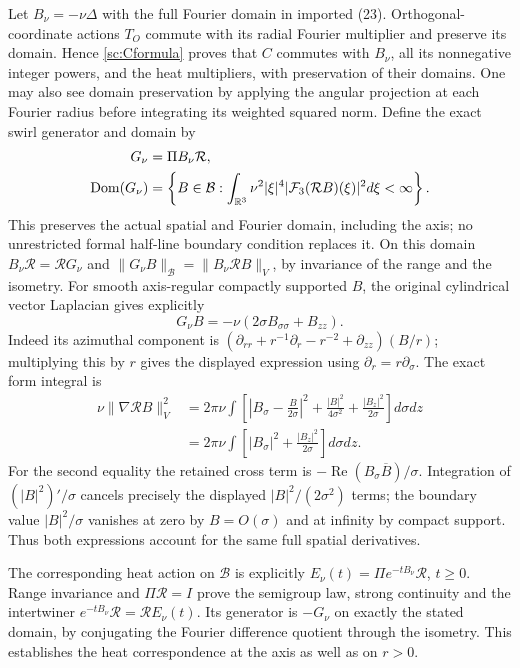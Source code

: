 Let $B_\nu=-\nu\Delta$ with the full Fourier domain in imported
(23). Orthogonal-coordinate actions $T_O$ commute with its radial
Fourier multiplier and preserve its domain. Hence \eqref{sc:Cformula}
proves that $C$ commutes with $B_\nu$, all its nonnegative integer
powers, and the heat multipliers, with preservation of their domains.
One may also see domain preservation by applying the angular projection
at each Fourier radius before integrating its weighted squared norm.
Define the exact swirl generator and domain by
\begin{align*}
 G_\nu&=\Pi B_\nu\mathcal R,\\
 \operatorname{Dom}(G_\nu)
 &=\left\{B\in\mathcal B:
    \int_{\mathbb R^3}\nu^2|\xi|^4
       |\mathcal F_3(\mathcal RB)(\xi)|^2d\xi<\infty\right\}.
\end{align*}
This preserves the actual spatial and Fourier domain, including the
axis; no unrestricted formal half-line boundary condition replaces it.
On this domain $B_\nu\mathcal R=\mathcal RG_\nu$ and
$\|G_\nu B\|_{\mathcal B}=\|B_\nu\mathcal RB\|_V$,
by invariance of the range and the isometry.
For smooth axis-regular compactly supported $B$, the original
cylindrical vector Laplacian gives explicitly
\[
 G_\nu B=-\nu(2\sigma B_{\sigma\sigma}+B_{zz}).
\]
Indeed its azimuthal component is
$(\partial_{rr}+r^{-1}\partial_r-r^{-2}+\partial_{zz})(B/r)$;
multiplying this by $r$ gives the displayed expression using
$\partial_r=r\partial_\sigma$. The exact form integral is
\begin{align*}
 \nu\|\nabla\mathcal RB\|_V^2
 &=2\pi\nu\int\left[
   \left|B_\sigma-\frac{B}{2\sigma}\right|^2
       +\frac{|B|^2}{4\sigma^2}
       +\frac{|B_z|^2}{2\sigma}\right]d\sigma dz\\
 &=2\pi\nu\int\left[|B_\sigma|^2
                         +\frac{|B_z|^2}{2\sigma}\right]d\sigma dz.
\end{align*}
For the second equality the retained cross term is
$-\operatorname{Re}(B_\sigma\overline B)/\sigma$.
Integration of $(|B|^2)'/\sigma$ cancels precisely the displayed
$|B|^2/(2\sigma^2)$ terms; the boundary value $|B|^2/\sigma$
vanishes at zero by $B=O(\sigma)$ and at infinity by compact support.
Thus both expressions account for the same full spatial derivatives.

The corresponding heat action on $\mathcal B$ is explicitly
$E_\nu(t)=\Pi e^{-tB_\nu}\mathcal R$, $t\geq0$.
Range invariance and $\Pi\mathcal R=I$ prove the semigroup law,
strong continuity and the intertwiner
$e^{-tB_\nu}\mathcal R=\mathcal RE_\nu(t)$.
Its generator is $-G_\nu$ on exactly the stated domain, by conjugating
the Fourier difference quotient through the isometry. This establishes
the heat correspondence at the axis as well as on $r>0$.

